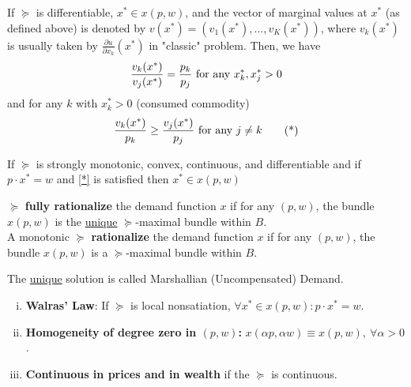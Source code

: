 \documentclass[11pt]{elegantbook}
\begin{document}
\begin{proposition}
    If $\succeq$ is differentiable, $x^*\in x(p,w)$, and the vector of marginal values at $x^*$ (as defined above) is denoted by $v(x^*)=(v_1(x^*),...,v_K(x^*))$, where $v_k(x^*)$ is usually taken by $\frac{\partial u}{\partial x_k}(x^*)$ in "classic" problem. Then, we have
    \begin{equation}
        \begin{aligned}
            \frac{v_k(x^*)}{v_j(x^*)}=\frac{p_k}{p_j} \textnormal{ for any }x^*_k,x^*_j>0
        \end{aligned}
        \nonumber
    \end{equation}
    and for any $k$ with $x_k^*>0$ (consumed commodity)
    \begin{equation}
        \begin{aligned}
            \frac{v_k(x^*)}{p_k}\geq \frac{v_j(x^*)}{p_j}\textnormal{ for any }j\neq k
        \end{aligned}
        \tag{*}
        \label{*}
    \end{equation}
\end{proposition}

\begin{corollary}
    If $\succeq$ is strongly monotonic, convex, continuous, and differentiable and if $p\cdot x^*=w$ and \eqref{*} is satisfied then $x^*\in x(p,w)$
\end{corollary}

\begin{definition}[Rationalize]
    \normalfont
    $\succeq$ \textbf{fully rationalize} the demand function $x$ if for any $(p,w)$, the bundle $x(p,w)$ is the \underline{unique} $\succeq$-maximal bundle within $B$.\\
    A monotonic $\succeq$ \textbf{rationalize} the demand function $x$ if for any $(p,w)$, the bundle $x(p,w)$ is a $\succeq$-maximal bundle within $B$.
\end{definition}

The \underline{unique} solution is called Marshallian (Uncompensated) Demand.

\begin{proposition}
    \begin{enumerate}[(i).]
        \item \textbf{Walras' Law}: If $\succeq$ is local nonsatiation, $\forall x^*\in x(p,w): p\cdot x^*=w$.
        \item \textbf{Homogeneity of degree zero in $( p, w )$:} $x (\alpha p, \alpha w )\equiv x ( p, w ),\ \forall \alpha > 0$.
        \item \textbf{Continuous in prices and in wealth} if the $\succeq$ is continuous.
    \end{enumerate}
\end{proposition}
\end{document}
